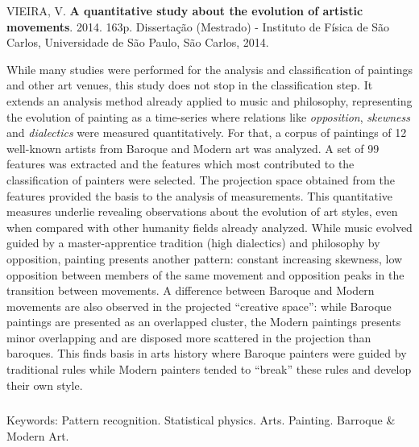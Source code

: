 \afterpage{\blankpage}

\begin{abstract2}
\vspace{-10mm}
VIEIRA, V. \textbf{A quantitative study about the evolution of artistic movements}. 2014. 163p. Dissertação (Mestrado) - Instituto de Física de São Carlos, Universidade de São Paulo, São Carlos, 2014.
\vspace{15mm}

  While many studies were performed for the analysis and classification of
  paintings and other art venues, this study does not stop in the classification
  step. It extends an analysis method already applied to music and philosophy,
  representing the evolution of painting as a time-series where relations like
  \textit{opposition}, \textit{skewness} and \textit{dialectics} were measured
  quantitatively. For that, a corpus of paintings of 12 well-known artists from
  Baroque and Modern art was analyzed. A set of 99 features was extracted and
  the features which most contributed to the classification of painters were
  selected. The projection space obtained from the features provided the basis
  to the analysis of measurements. This quantitative measures underlie revealing
  observations about the evolution of art styles, even when compared with other
  humanity fields already analyzed. While music evolved guided by a
  master-apprentice tradition (high dialectics) and philosophy by opposition,
  painting presents another pattern: constant increasing skewness, low
  opposition between members of the same movement and opposition peaks in the
  transition between movements. A difference between Baroque and Modern
  movements are also observed in the projected ``creative space'': while Baroque
  paintings are presented as an overlapped cluster, the Modern paintings
  presents minor overlapping and are disposed more scattered in the projection
  than baroques. This finds basis in arts history where Baroque painters were
  guided by traditional rules while Modern painters tended to ``break'' these
  rules and develop their own style.

$\phantom{linha em branco}$\\
Keywords: Pattern recognition. Statistical physics. Arts. Painting. Barroque \& Modern Art.

\end{abstract2}
